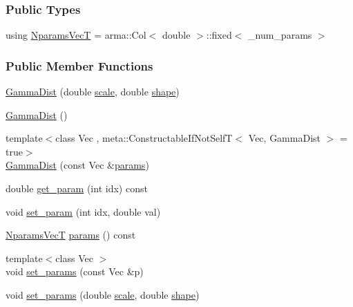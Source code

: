 \subsubsection*{Public Types}
\begin{DoxyCompactItemize}
\item 
using \hyperlink{classprior__hessian_1_1GammaDist_a01fd80ddf66dbb4eedb73e5ee272e838}{Nparams\+VecT} = arma\+::\+Col$<$ double $>$\+::fixed$<$ \+\_\+num\+\_\+params $>$
\end{DoxyCompactItemize}
\subsubsection*{Public Member Functions}
\begin{DoxyCompactItemize}
\item 
\hyperlink{classprior__hessian_1_1GammaDist_ab898505ee0b066004c7ae2593429561d}{Gamma\+Dist} (double \hyperlink{classprior__hessian_1_1GammaDist_a455e42461877165e4101f9f7f33ae84d}{scale}, double \hyperlink{classprior__hessian_1_1GammaDist_a2c8b6939f7920e2e81532b5c1970567a}{shape})
\item 
\hyperlink{classprior__hessian_1_1GammaDist_aba5c79517670be73685664a3832bf372}{Gamma\+Dist} ()
\item 
{\footnotesize template$<$class Vec , meta\+::\+Constructable\+If\+Not\+Self\+T$<$ Vec, Gamma\+Dist $>$  = true$>$ }\\\hyperlink{classprior__hessian_1_1GammaDist_a3620d9650205c489c2581565eb791ac8}{Gamma\+Dist} (const Vec \&\hyperlink{classprior__hessian_1_1GammaDist_a8d30af8f996353fdae1d19a43bf6b016}{params})
\item 
double \hyperlink{classprior__hessian_1_1GammaDist_a180dd2c755813ec0542e8eed7b25f1fb}{get\+\_\+param} (int idx) const 
\item 
void \hyperlink{classprior__hessian_1_1GammaDist_ae251e9c7554efbd780205a142750b604}{set\+\_\+param} (int idx, double val)
\item 
\hyperlink{classprior__hessian_1_1GammaDist_a01fd80ddf66dbb4eedb73e5ee272e838}{Nparams\+VecT} \hyperlink{classprior__hessian_1_1GammaDist_a8d30af8f996353fdae1d19a43bf6b016}{params} () const 
\item 
{\footnotesize template$<$class Vec $>$ }\\void \hyperlink{classprior__hessian_1_1GammaDist_aebc6101c1e09881dacfee4da4c950d40}{set\+\_\+params} (const Vec \&p)
\item 
void \hyperlink{classprior__hessian_1_1GammaDist_a5ef4bf8796d1a35465d5221e8cde16b3}{set\+\_\+params} (double \hyperlink{classprior__hessian_1_1GammaDist_a455e42461877165e4101f9f7f33ae84d}{scale}, double \hyperlink{classprior__hessian_1_1GammaDist_a2c8b6939f7920e2e81532b5c1970567a}{shape})

\end{DoxyCompactItemize}
